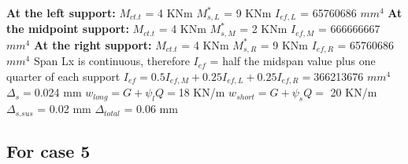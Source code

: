 \documentclass{article}%
\begin{document}
%
\newline%
\newline%
%
\textbf{At the left support:}%
\newline%
\newline%
%
$M_{ct.t}$ = 4 KNm%
\newline%
%
$M_{s,L}^{*}$ = 9 KNm%
\newline%
%
$I_{ef,L}$ = 65760686 $mm^{4}$%
\newline%
\newline%
%
\textbf{At the midpoint support:}%
\newline%
\newline%
%
$M_{ct.t}$ = 4 KNm%
\newline%
%
$M_{s,M}^{*}$ = 2 KNm%
\newline%
%
$I_{ef,M}$ = 666666667 $mm^{4}$%
\newline%
\newline%
%
\textbf{At the right support:}%
\newline%
\newline%
%
$M_{ct.t}$ = 4 KNm%
\newline%
%
$M_{s,R}^{*}$ = 9 KNm%
\newline%
%
$I_{ef,R}$ = 65760686 $mm^{4}$%
\newline%
\newline%
%
Span Lx is continuous, therefore $I_{ef}$ = half the midspan value plus one quarter of each support%
\newline%
\newline%
%
$I_{ef} = 0.5I_{ef,M} + 0.25I_{ef,L} + 0.25I_{ef,R} = $366213676 $ mm^{4}$%
\newline%
\newline%
%
$\Delta_{s} =$0.024 mm%
\newline%
\newline%
%
$w_{long} = G + \psi_{l}Q = $18 KN/m%
\newline%
%
$w_{short} = G + \psi_{s}Q = $ 20 KN/m%
\newline%
\newline%
%
$\Delta_{s.sus}$ = 0.02 mm%
\newline%
\newline%
%
$\Delta_{total}$ = 0.06 mm%
\subsection*{For case 5}%
\label{subsec:Forcase5}%
\end{document}

